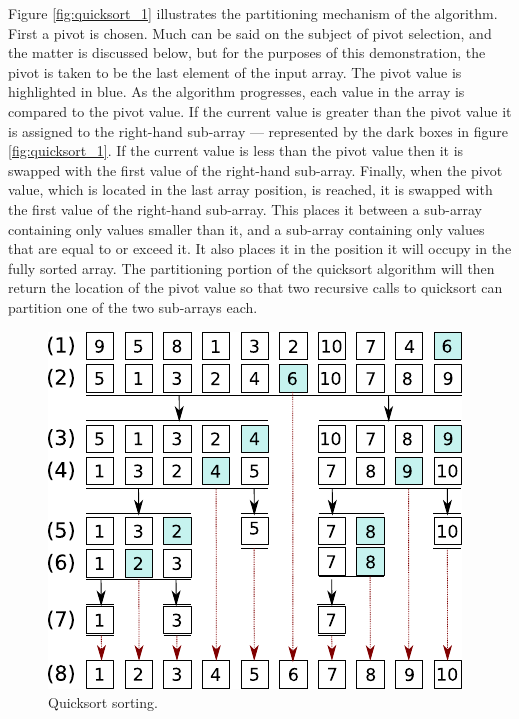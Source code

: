 \documentclass[12pt, a4paper]{article}
\begin{document}
Figure \ref{fig:quicksort_1} illustrates the partitioning mechanism of the algorithm. First a pivot is chosen. Much can be said on the subject of pivot selection, and the matter is discussed below, but for the purposes of this demonstration, the pivot is taken to be the last element of the input array. The pivot value is highlighted in blue. As the algorithm progresses, each value in the array is compared to the pivot value. If the current value is greater than the pivot value it is assigned to the right-hand sub-array — represented by the dark boxes in figure \ref{fig:quicksort_1}. If the current value is less than the pivot value then it is swapped with the first value of the right-hand sub-array. Finally, when the pivot value, which is located in the last array position, is reached, it is swapped with the first value of the right-hand sub-array. This places it between a sub-array containing only values smaller than it, and a sub-array containing only values that are equal to or exceed it. It also places it in the position it will occupy in the fully sorted array. The partitioning portion of the quicksort algorithm will then return the location of the pivot value so that two recursive calls to quicksort can partition one of the two sub-arrays each.

\begin{figure}
    \centering
    \includegraphics{figures/quicksort_2.pdf}
    \caption{\label{fig:quicksort_2}Quicksort sorting.}
\end{figure}
\end{document}
